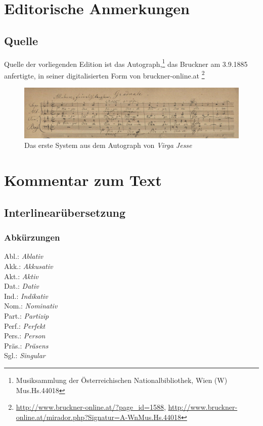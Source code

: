 \documentclass[a4paper]{book}
\begin{document}
\section{Editorische Anmerkungen}

\subsection{Quelle}

Quelle der vorliegenden Edition ist das Autograph,\footnote{Musiksammlung der Österreichischen Nationalbibliothek, Wien (W) Mus.Hs.44018} das Bruckner am 3.9.1885 anfertigte, in seiner digitalisierten Form von bruckner-online.at \footnote{\url{http://www.bruckner-online.at/?page_id=1588}, \url{http://www.bruckner-online.at/mirador.php?Signatur=A-WnMus.Hs.44018}}

\begin{figure}[h]
\includegraphics[width=\textwidth]{Graduale_First_System.png}
\caption{Das erste System aus dem Autograph von \emph{Virga Jesse}}
\end{figure}

\section{Kommentar zum Text}

\subsection{Interlinearübersetzung}

\begin{center}

\end{center}

\subsubsection{Abkürzungen}
\begin{multicols}{4}
  \noindent Abl.: \textit{Ablativ} \\
  Akk.: \textit{Akkusativ} \\
  Akt.: \textit{Aktiv} \\
  Dat.: \textit{Dativ} \\
  Ind.: \textit{Indikativ} \\
  Nom.: \textit{Nominativ} \\
  Part.: \textit{Partizip} \\
  Perf.: \textit{Perfekt} \\
  Pers.: \textit{Person} \\
  Präs.: \textit{Präsens} \\
  Sgl.: \textit{Singular} \\
\end{multicols} 
\end{document}
